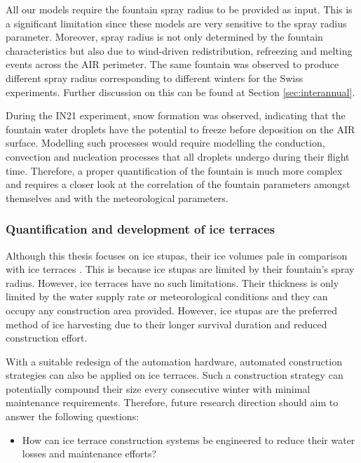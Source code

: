All our models require the fountain spray radius to be provided as input. This is a significant limitation
since these models are very sensitive to the spray radius parameter. Moreover, spray radius is not only determined
by the fountain characteristics but also due to wind-driven redistribution, refreezing and melting events across
the AIR perimeter. The same fountain was observed to produce different spray radius corresponding to different
winters for the Swiss experiments. Further discussion on this can be found at Section \ref{sec:interannual}.

During the IN21 experiment, snow formation was observed, indicating that the fountain water droplets have the
potential to freeze before deposition on the AIR surface. Modelling such processes would require modelling the
conduction, convection and nucleation processes that all droplets undergo during their flight time. Therefore, a
proper quantification of the fountain is much more complex and requires a closer look at the correlation of the
fountain parameters amongst themselves and with the meteorological parameters.

\subsubsection{Quantification and development of ice terraces}

Although this thesis focuses on ice stupas, their ice volumes pale in comparison with ice terraces
\citep{nusserSociohydrologyArtificialGlaciers2019}. This is because ice stupas are limited by their fountain's
spray radius. However, ice terraces have no such limitations. Their thickness is only limited by the water
supply rate or meteorological conditions and they can occupy any construction area provided. However, ice stupas
are the preferred method of ice harvesting due to their longer survival duration and reduced construction
effort.

With a suitable redesign of the automation hardware, automated construction strategies can also be applied on
ice terraces. Such a construction strategy can potentially compound their size every consecutive winter with
minimal maintenance requirements. Therefore, future research direction should aim to answer the following
questions:

\begin{itemize}

	\item How can ice terrace construction systems be engineered to reduce their water losses and maintenance
	      efforts?

\end{itemize}

